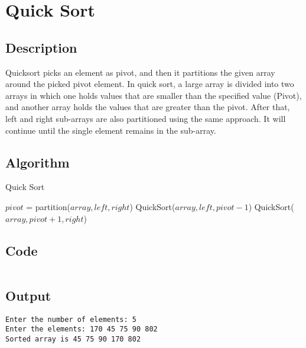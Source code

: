 \section{Quick Sort}

\subsection{Description}
Quicksort picks an element as pivot, and then it partitions the given array around the
picked pivot element. In quick sort, a large array is divided into two arrays in which one
holds values that are smaller than the specified value (Pivot), and another array holds
the values that are greater than the pivot.
After that, left and right sub-arrays are also partitioned using the same approach. It will
continue until the single element remains in the sub-array.

\subsection{Algorithm}

%

\begin{algorithm}[H]
    \caption{Quick Sort}
    \begin{algorithmic}[1]
        \State $pivot$ = partition($array, left, right$)
        \State QuickSort($array, left, pivot - 1$)
        \State QuickSort($array, pivot + 1, right$)
        \EndIf
        \EndProcedure
    \end{algorithmic}
\end{algorithm}

\subsection{Code}

\inputminted[fontsize=\footnotesize,bgcolor=bg,linenos,autogobble,frame=single,framerule=0.01pt,rulecolor=FSBorder,stripall]{c++}{code/quick.cpp}

\subsection{Output}

\begin{lstlisting}[style=output]
Enter the number of elements: 5
Enter the elements: 170 45 75 90 802
Sorted array is 45 75 90 170 802
\end{lstlisting}